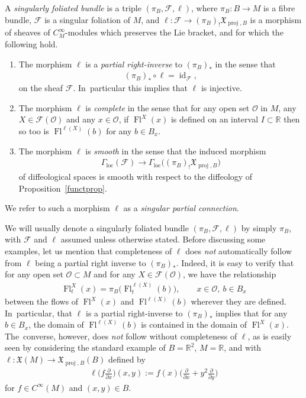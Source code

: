 \documentclass[pdftex]{sigma}
\numberwithin{equation}{section}
\def\loc{\operatorname{loc}}
\def\id{\operatorname{id}}
\def\proj{\operatorname{proj}}
\def\Fl{\operatorname{Fl}}
\def\FF{{\mathcal{F}}}
\def\OO{{\mathcal{O}}}
\def\RB{{\mathbb{R}}}
\def\XF{{\mathfrak{X}}}
\begin{document}
\begin{Definition}\label{singfolbund}
A \textit{singularly foliated bundle} is a triple $(\pi_{B},\FF,\ell)$, where $\pi_{B}\colon B\rightarrow M$ is a fibre bundle, $\FF$ is a singular foliation of $M$, and $\ell\colon \FF\rightarrow(\pi_{B})_{!}\XF_{\proj,B}$ is a morphism of sheaves of $C^{\infty}_{M}$-modules which preserves the Lie bracket, and for which the following hold.
\begin{enumerate}\itemsep=0pt
\item The morphism $\ell$ is a \textit{partial right-inverse} to $(\pi_{B})_{*}$ in the sense that
\begin{gather*}
(\pi_{B})_{*}\circ\ell = \id_{\FF},
\end{gather*}
on the sheaf $\FF$. In~particular this implies that $\ell$ is injective.
\item The morphism $\ell$ is \textit{complete} in the sense that for any open set $\OO$ in $M$, any $X\in\FF(\OO)$ and any $x\in\OO$, if $\Fl^{X}(x)$ is defined on an interval $I\subset\RB$ then so too is $\Fl^{\ell(X)}(b)$ for any $b\in B_{x}$.
\item The morphism $\ell$ is \textit{smooth} in the sense that the induced morphism
\begin{gather*}
\Gamma_{\loc}(\FF)\rightarrow \Gamma_{\loc}\big((\pi_{B})_{!}\XF_{\proj,B}\big)
\end{gather*}
of diffeological spaces is smooth with respect to the diffeology of Proposition~\ref{functprop}.
\end{enumerate}
We refer to such a morphism $\ell$ as a \textit{singular partial connection}.
\end{Definition}

We will usually denote a singularly foliated bundle $(\pi_{B},\FF,\ell)$ by simply $\pi_{B}$, with $\FF$ and $\ell$ assumed unless otherwise stated. Before discussing some examples, let us mention that completeness of $\ell$ does \textit{not} automatically follow from $\ell$ being a partial right inverse to $(\pi_{B})_{*}$. Indeed, it is easy to verify that for any open set $\OO\subset M$ and for any $X\in\FF(\OO)$, we have the relationship
\begin{gather*}
\Fl^{X}_{t}(x) = \pi_{B}\big(\Fl^{\ell(X)}_{t}(b)\big),\qquad x\in\OO,\ b\in B_{x}
\end{gather*}
between the flows of $\Fl^{X}(x)$ and $\Fl^{\ell(X)}(b)$ wherever they are defined. In~particular, that $\ell$ is a partial right-inverse to $(\pi_{B})_{*}$ implies that for any $b\in B_{x}$, the domain of $\Fl^{\ell(X)}(b)$ is contained in the domain of $\Fl^{X}(x)$. The~converse, however, does \textit{not} follow without completeness of $\ell$, as is easily seen by considering the standard example of $B =\RB^{2}$, $M = \RB$, and with $\ell\colon \XF(M)\rightarrow\XF_{\proj,B}(B)$ defined by
\begin{gather*}
\ell\bigg(f\frac{\partial}{\partial x}\bigg)(x,y):=f(x)\bigg(\frac{\partial}{\partial x}+y^{2}\frac{\partial}{\partial y}\bigg)
\end{gather*}
for $f\in C^{\infty}(M)$ and $(x,y)\in B$.
\end{document}
